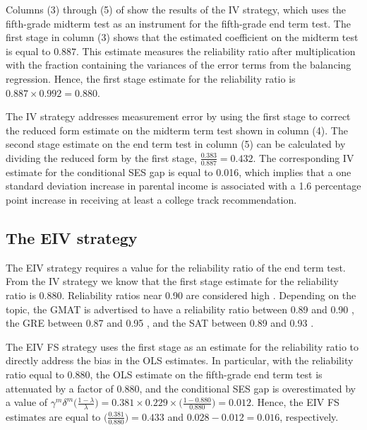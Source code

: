 Columns (3) through (5) of  show the results of the IV strategy, which uses the fifth-grade midterm test as an instrument for the fifth-grade end term test. The first stage in column (3) shows that the estimated coefficient on the midterm test is equal to $0.887$. This estimate measures the reliability ratio after multiplication with the fraction containing the variances of the error terms from the balancing regression. Hence, the first stage estimate for the reliability ratio is $0.887 \times 0.992 = 0.880$.

The IV strategy addresses measurement error by using the first stage to correct the reduced form estimate on the midterm term test shown in column (4). The second stage estimate on the end term test in column (5) can be calculated by dividing the reduced form by the first stage, $\frac{0.383}{0.887}=0.432$. The corresponding IV estimate for the conditional SES gap is equal to 0.016, which implies that a one standard deviation increase in parental income is associated with a 1.6 percentage point increase in receiving at least a college track recommendation.

\subsection{The EIV strategy}

The EIV strategy requires a value for the reliability ratio of the end term test. From the IV strategy we know that the first stage estimate for the reliability ratio is 0.880. Reliability ratios near 0.90 are considered high \citep{Cito2017}. Depending on the topic, the GMAT is advertised to have a reliability ratio between 0.89 and 0.90 \citep{GMAT2023}, the GRE between 0.87 and 0.95 \citep{ETS2023}, and the SAT between 0.89 and 0.93 \citep{collegeboard2013}. 

The EIV FS strategy uses the first stage as an estimate for the reliability ratio to directly address the bias in the OLS estimates. In particular, with the reliability ratio equal to $0.880$, the OLS estimate on the fifth-grade end term test is attenuated by a factor of $0.880$, and the conditional SES gap is overestimated by a value of $\gamma^m \delta^m \big(\frac{1-\lambda}{\lambda}\big)=0.381\times0.229\times\big(\frac{1-0.880}{0.880}\big)=0.012$. Hence, the EIV FS estimates are equal to $\big(\frac{0.381}{0.880}\big)=0.433$ and $0.028-0.012=0.016$, respectively. 



